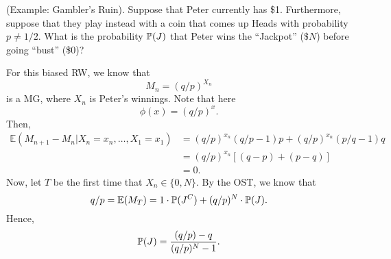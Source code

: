 \documentclass[letterpaper]{article}
\begin{document}
\begin{mdframed}[]
    (Example: Gambler's Ruin). Suppose that Peter currently has \$1. Furthermore, suppose that they play instead with a coin that comes up Heads with probability $p \neq 1/2$. What is the probability $\mathbb{P}(J)$ that Peter wins the ``Jackpot'' ($\$N$) before going ``bust'' (\$0)?

    \begin{mdframed}[]
        For this biased RW, we know that \[M_n = (q / p)^{X_n}\] is a MG, where $X_n$ is Peter's winnings. Note that here \[\phi(x) = (q / p)^x.\] Then, 
        \begin{equation*}
            \begin{aligned}
                \mathbb{E}(M_{n + 1} - M_{n} | X_n = x_n, \dots, X_1 = x_1) &= (q / p)^{x_n} (q / p - 1)p + (q / p)^{x_n} (p / q - 1)q \\ 
                    &= (q / p)^{x_n}[(q - p) + (p - q)] \\ 
                    &= 0.
            \end{aligned}
        \end{equation*}
        Now, let $T$ be the first time that $X_n \in \{0, N\}$. By the OST, we know that \[q / p = \mathbb{E}(M_T) = 1 \cdot \mathbb{P}(J^C) + (q / p)^N \cdot \mathbb{P}(J).\]
        Hence, \[\mathbb{P}(J) = \frac{(q / p) - q}{(q / p)^N - 1}.\]
    \end{mdframed}
\end{mdframed}

\end{document}

